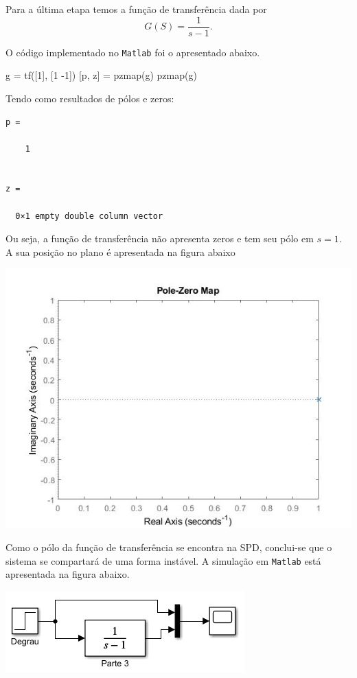 \documentclass[
]{book}
\newenvironment{Shaded}{\begin{snugshade}}{\end{snugshade}}
\newcommand{\FloatTok}[1]{\textcolor[rgb]{0.00,0.00,0.81}{#1}}
\newcommand{\NormalTok}[1]{#1}
\theoremstyle{definition}
\theoremstyle{definition}
\theoremstyle{definition}
\theoremstyle{remark}
\begin{document}
Para a última etapa temos a função de transferência dada por
\[
G(S)= \frac {1}{s-1}.
\]

O código implementado no \texttt{Matlab} foi o apresentado abaixo.

\begin{Shaded}
\begin{Highlighting}[]
\NormalTok{g = tf([}\FloatTok{1}\NormalTok{], [}\FloatTok{1}\NormalTok{ -}\FloatTok{1}\NormalTok{])}
\NormalTok{[p, z] = pzmap(g)}
\NormalTok{pzmap(g)}
\end{Highlighting}
\end{Shaded}

Tendo como resultados de pólos e zeros:

\begin{verbatim}
p =

    1


z =

  0×1 empty double column vector
\end{verbatim}

Ou seja, a função de transferência não apresenta zeros e tem seu pólo em \(s = 1\). A sua posição no plano é apresentada na figura abaixo

\includegraphics{Imagens/Lab2/tau3.jpg}

Como o pólo da função de transferência se encontra na SPD, conclui-se que o sistema se compartará de uma forma instável. A simulação em \texttt{Matlab} está apresentada na figura abaixo.

\includegraphics{Imagens/Lab2/sim2.jpg}
\end{document}

